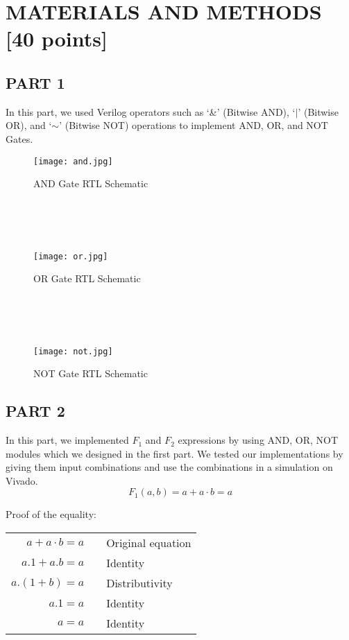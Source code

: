 \documentclass[pdftex,12pt,a4paper]{article}
\begin{document}
\section{MATERIALS AND METHODS [40 points]}



\subsection{PART 1}

In this part, we used Verilog operators such as ‘\&’ (Bitwise AND), ‘\(|\)’ (Bitwise OR), and ‘\(\sim\)’ (Bitwise NOT) operations to implement AND, OR, and NOT Gates.  \\

\begin{figure}[hbt!]
	\centering
	\texttt{[image: and.jpg]}	
	\caption{AND Gate RTL Schematic}
	\label{fig1}
\end{figure}\\
\\
\\
\begin{figure}[hbt!]
	\centering
	\texttt{[image: or.jpg]}	
	\caption{OR Gate RTL Schematic}
	\label{fig2}
	
\end{figure}\\
\\
\\
\begin{figure}[hbt!]
	\centering
	\texttt{[image: not.jpg]}	
	\caption{NOT Gate RTL Schematic}
	\label{fig3}

\end{figure}

\clearpage


\subsection{PART 2}
In this part, we implemented \(F_1\)  and \(F_2\) expressions by using AND, OR, NOT modules which we designed in the first part. We tested our implementations by giving them input combinations and use the combinations in a simulation on Vivado.
\\

\[F_1(a,b)=a+a·b=a \]

Proof of the equality: 
\\

\begin{tabular}{rcl}
\(a + a · b = a \)  &  & Original equation \\
\(a . 1 + a . b = a  \)  &  & Identity \\
\(a . (1 + b) = a\)  &  & Distributivity \\
\(a . 1 = a \)  &  & Identity \\
\(a = a \)  &  & Identity \\
\end{tabular}
\end{document}
